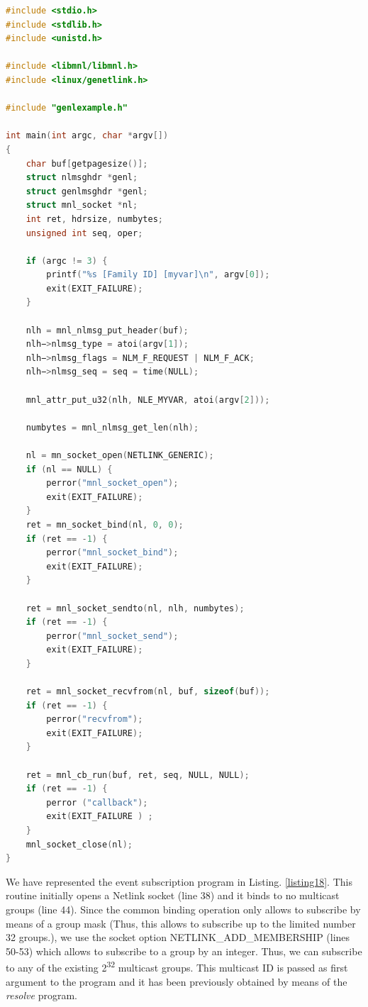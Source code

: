 \documentclass[10pt,onecolumn]{article}
\begin{document}
\begin{lstlisting}[language=C, caption=change.c for GeNetlink, label=listing17]
#include <stdio.h>
#include <stdlib.h>
#include <unistd.h>

#include <libmnl/libmnl.h>
#include <linux/genetlink.h>

#include "genlexample.h"

int main(int argc, char *argv[])
{
    char buf[getpagesize()];
    struct nlmsghdr *genl;
    struct genlmsghdr *genl;
    struct mnl_socket *nl;
    int ret, hdrsize, numbytes;
    unsigned int seq, oper;

    if (argc != 3) {
        printf("%s [Family ID] [myvar]\n", argv[0]);
        exit(EXIT_FAILURE);
    }

    nlh = mnl_nlmsg_put_header(buf);
    nlh−>nlmsg_type = atoi(argv[1]);
    nlh−>nlmsg_flags = NLM_F_REQUEST | NLM_F_ACK;
    nlh−>nlmsg_seq = seq = time(NULL);

    mnl_attr_put_u32(nlh, NLE_MYVAR, atoi(argv[2]));

    numbytes = mnl_nlmsg_get_len(nlh);

    nl = mn_socket_open(NETLINK_GENERIC);
    if (nl == NULL) {
        perror("mnl_socket_open");
        exit(EXIT_FAILURE);
    }
    ret = mn_socket_bind(nl, 0, 0);
    if (ret == -1) {
        perror("mnl_socket_bind");
        exit(EXIT_FAILURE);
    }

    ret = mnl_socket_sendto(nl, nlh, numbytes);
    if (ret == -1) {
        perror("mnl_socket_send");
        exit(EXIT_FAILURE);
    }

    ret = mnl_socket_recvfrom(nl, buf, sizeof(buf));
    if (ret == -1) {
        perror("recvfrom");
        exit(EXIT_FAILURE);
    }

    ret = mnl_cb_run(buf, ret, seq, NULL, NULL);
    if (ret == -1) {
        perror ("callback");
        exit(EXIT_FAILURE ) ;
    }
    mnl_socket_close(nl);
}
\end{lstlisting}

We have represented the event subscription program in Listing. \ref{listing18}. This routine initially opens a Netlink socket (line 38) and it binds to no multicast groups (line 44). Since the common binding operation only allows to subscribe by means of a group mask (Thus, this allows to subscribe up to the limited number 32 groups.), we use the socket option NETLINK\_ADD\_MEMBERSHIP (lines 50-53) which allows to subscribe to a group by an integer. Thus, we can subscribe to any of the existing 2\textsuperscript{32} multicast groups. This multicast ID is passed as first argument to the program and it has been previously obtained by means of the \textit{resolve} program.
\end{document}
